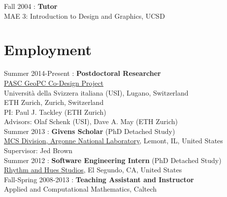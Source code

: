 \documentclass[12pt]{article}
\begin{document}
\noindent Fall 2004 : \textbf{Tutor}\\
 MAE 3: Introduction to Design and Graphics, UCSD\\

\section*{Employment}

\noindent Summer 2014-Present : \textbf{Postdoctoral Researcher} \\
\href{http://www.pasc-ch.org/projects/projects/geopc/}{PASC GeoPC Co-Design Project} \\
Universit\`{a} della Svizzera italiana (USI), Lugano, Switzerland \\
ETH Zurich, Zurich, Switzerland \\
PI: Paul J. Tackley (ETH Zurich) \\
Advisors: Olaf Schenk (USI), Dave A. May (ETH Zurich) \\


\noindent Summer 2013 : \textbf{Givens Scholar} (PhD Detached Study) \\
\href{http://www.mcs.anl.gov}{MCS Division, Argonne National Laboratory}, Lemont, IL, United States \\
Supervisor: Jed Brown \\


\noindent Summer 2012 : \textbf{Software Engineering Intern} (PhD Detached Study)\\
\href{http://www.rhythm.com}{Rhythm and Hues Studios},
El Segundo, CA, United States \\


\noindent Fall-Spring 2008-2013 : \textbf{Teaching Assistant and Instructor}\\
Applied and Computational Mathematics, Caltech\\
\end{document}
